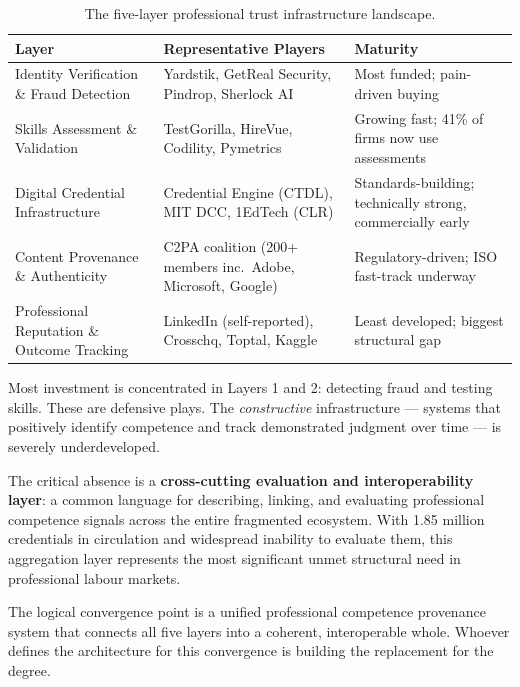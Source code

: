 \documentclass[11pt,a4paper]{article}
\begin{document}
\begin{table}[h]
\centering
\small
\begin{tabular}{@{}p{}p{}p{}@{}}
\toprule
\textbf{Layer} & \textbf{Representative Players} & \textbf{Maturity} \\
\midrule
Identity Verification \& Fraud Detection
  & Yardstik, GetReal Security, Pindrop, Sherlock AI
  & Most funded; pain-driven buying \\
\addlinespace
Skills Assessment \& Validation
  & TestGorilla, HireVue, Codility, Pymetrics
  & Growing fast; 41\% of firms now use assessments \\
\addlinespace
Digital Credential Infrastructure
  & Credential Engine (CTDL), MIT DCC, 1EdTech (CLR)
  & Standards-building; technically strong, commercially early \\
\addlinespace
Content Provenance \& Authenticity
  & C2PA coalition (200+ members inc.\ Adobe, Microsoft, Google)
  & Regulatory-driven; ISO fast-track underway \\
\addlinespace
Professional Reputation \& Outcome Tracking
  & LinkedIn (self-reported), Crosschq, Toptal, Kaggle
  & Least developed; biggest structural gap \\
\bottomrule
\end{tabular}
\caption{The five-layer professional trust infrastructure landscape.}
\end{table}

Most investment is concentrated in Layers 1 and 2: detecting fraud and testing skills. These are
defensive plays. The \emph{constructive} infrastructure — systems that positively identify
competence and track demonstrated judgment over time — is severely underdeveloped.

The critical absence is a \textbf{cross-cutting evaluation and interoperability layer}: a common
language for describing, linking, and evaluating professional competence signals across the entire
fragmented ecosystem. With 1.85 million credentials in circulation and widespread inability to
evaluate them, this aggregation layer represents the most significant unmet structural need in
professional labour markets.

The logical convergence point is a unified professional competence provenance system that
connects all five layers into a coherent, interoperable whole. Whoever defines the architecture
for this convergence is building the replacement for the degree.

\end{document}
